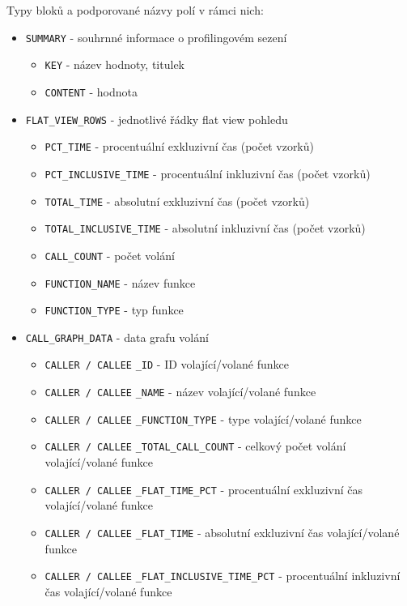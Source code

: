 \documentclass[czech,BP]{thesiskiv}
\begin{document}
Typy bloků a podporované názvy polí v rámci nich:

\renewcommand{\labelitemii}{$\bullet$}

\begin{itemize}
\item \texttt{SUMMARY} - souhrnné informace o profilingovém sezení
	\begin{itemize}
	\item \texttt{KEY} - název hodnoty, titulek
	\item \texttt{CONTENT} - hodnota
	\end{itemize}
\item \texttt{FLAT\_VIEW\_ROWS} - jednotlivé řádky flat view pohledu
	\begin{itemize}
	\item \texttt{PCT\_TIME} - procentuální exkluzivní čas (počet vzorků)
	\item \texttt{PCT\_INCLUSIVE\_TIME} - procentuální inkluzivní čas (počet vzorků)
	\item \texttt{TOTAL\_TIME} - absolutní exkluzivní čas (počet vzorků)
	\item \texttt{TOTAL\_INCLUSIVE\_TIME} - absolutní inkluzivní čas (počet vzorků)
	\item \texttt{CALL\_COUNT} - počet volání
	\item \texttt{FUNCTION\_NAME} - název funkce
	\item \texttt{FUNCTION\_TYPE} - typ funkce
	\end{itemize}
\item \texttt{CALL\_GRAPH\_DATA} - data grafu volání
	\begin{itemize}
	\item \texttt{CALLER / CALLEE} \texttt{\_ID} - ID volající/volané funkce
	\item \texttt{CALLER / CALLEE} \texttt{\_NAME} - název volající/volané funkce
	\item \texttt{CALLER / CALLEE} \texttt{\_FUNCTION\_TYPE} - type volající/volané funkce
	\item \texttt{CALLER / CALLEE} \texttt{\_TOTAL\_CALL\_COUNT} - celkový počet volání volající/volané funkce
	\item \texttt{CALLER / CALLEE} \texttt{\_FLAT\_TIME\_PCT} - procentuální exkluzivní čas volající/volané funkce
	\item \texttt{CALLER / CALLEE} \texttt{\_FLAT\_TIME} - absolutní exkluzivní čas volající/volané funkce
	\item \texttt{CALLER / CALLEE} \texttt{\_FLAT\_INCLUSIVE\_TIME\_PCT} - procentuální inkluzivní čas volající/volané funkce

\end{itemize}
\end{itemize}
\end{document}
